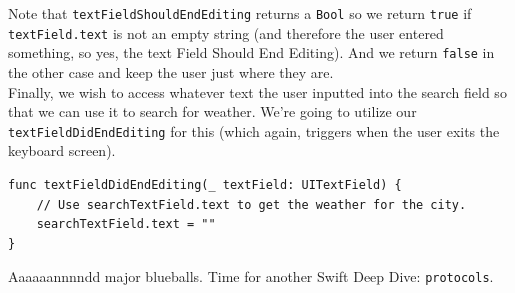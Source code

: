 \documentclass[12pt, letterpaper]{article}
\begin{document}
Note that \verb+textFieldShouldEndEditing+ returns a \verb+Bool+ so we return \verb+true+ if 
\newline \verb+textField.text+ is not an empty string (and therefore the user entered something, so yes, 
the text Field Should End Editing). And we return \verb+false+ in the other case and keep the user just where they are. \\

Finally, we wish to access whatever text the user inputted into the search field so that we can use it to search for
weather. We're going to utilize our \newline \verb+textFieldDidEndEditing+ for this (which again, triggers when the user exits
the keyboard screen).

\begin{verbatim}
func textFieldDidEndEditing(_ textField: UITextField) {
    // Use searchTextField.text to get the weather for the city.
    searchTextField.text = ""
}
\end{verbatim}

Aaaaaannnndd major blueballs. Time for another Swift Deep Dive: \verb+protocols+.
\end{document}
